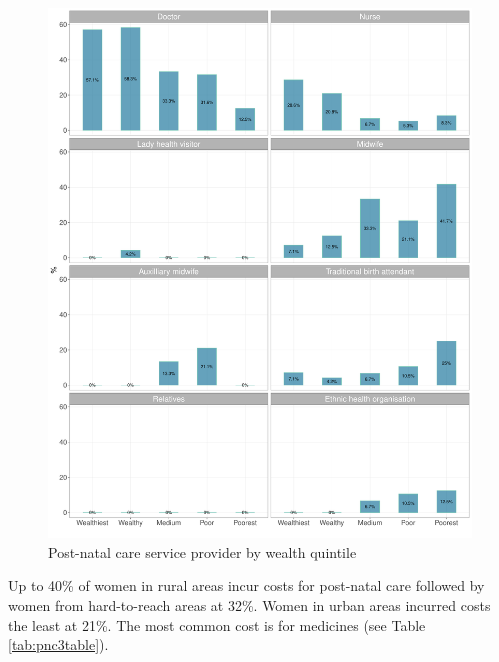 \documentclass[12pt,a4paper]{article}
\begin{document}
\begin{figure}[H]

{\centering \includegraphics{kayinReport_files/figure-latex/pnc4Plot-1} 

}

\caption{Post-natal care service provider by wealth quintile}\label{fig:pnc4Plot}
\end{figure}

\newpage

Up to 40\% of women in rural areas incur costs for post-natal care followed by women from hard-to-reach areas at 32\%. Women in urban areas incurred costs the least at 21\%. The most common cost is for medicines (see Table \ref{tab:pnc3table}).
\end{document}
